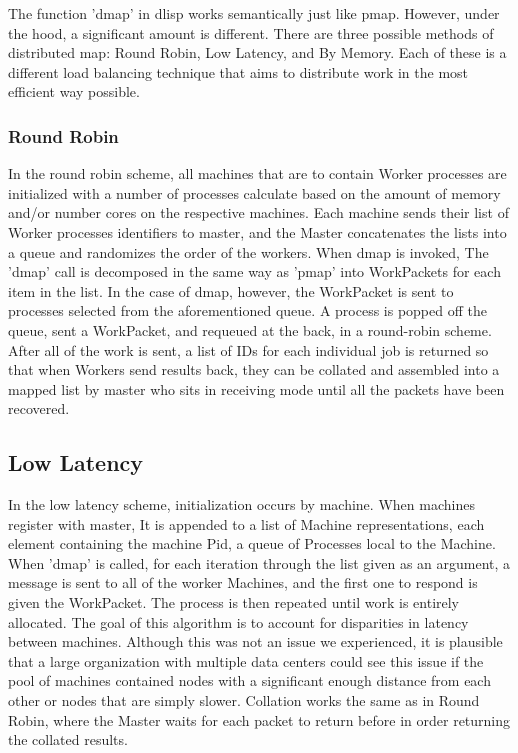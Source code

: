 \documentclass[letterpaper,twocolumn,10pt]{article}
\begin{document}
The function 'dmap' in dlisp works semantically just like pmap. However, under
the hood, a significant amount is different. There are three possible methods
of distributed map: Round Robin, Low Latency, and By Memory. Each of these is a
different load balancing technique that aims to distribute work in the most
efficient way possible.

\subsubsection{Round Robin}

In the round robin scheme, all machines that are to contain Worker processes
are initialized with a number of processes calculate based on the amount of
memory and/or number cores on the respective machines. Each machine sends their
list of Worker processes identifiers to master, and the Master concatenates the
lists into a queue and randomizes the order of the workers.  When dmap is
invoked, The 'dmap' call is decomposed in the same way as 'pmap' into
WorkPackets for each item in the list. In the case of dmap, however, the
WorkPacket is sent to processes selected from the aforementioned queue. A
process is popped off the queue, sent a WorkPacket, and requeued at the back,
in a round-robin scheme. After all of the work is sent, a list of IDs for each
individual job is returned so that when Workers send results back, they can be
collated and assembled into a mapped list by master who sits in receiving mode
until all the packets have been recovered. 


\subsection{Low Latency}

In the low latency scheme, initialization occurs by machine. When machines
register with master, It is appended to a list of Machine representations, each
element containing the machine Pid, a queue of Processes local to the Machine.
When 'dmap' is called, for each iteration through the list given as an
argument, a message is sent to all of the worker Machines, and the first one to
respond is given the WorkPacket. The process is then repeated until work is
entirely allocated.  The goal of this algorithm is to account for disparities
in latency between machines. Although this was not an issue we experienced, it
is plausible that a large organization with multiple data centers could see
this issue if the pool of machines contained nodes with a significant enough
distance from each other or nodes that are simply slower. Collation works the
same as in Round Robin, where the Master waits for each packet to return before
in order returning the collated results.
\end{document}
